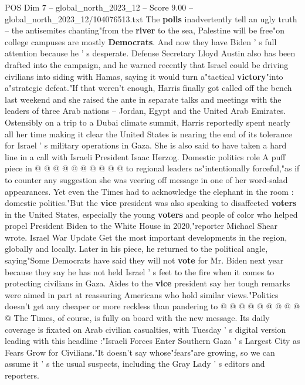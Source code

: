 \begin{textsample}{POS Dim 7 – global\_north\_2023\_12 – Score 9.00 – global\_north\_2023\_12/104076513.txt}  \label{ex:f7_pos_152}
The \textbf{polls} inadvertently tell an ugly truth -- the antisemites chanting"from the \textbf{river} to the sea, Palestine will be free"on college campuses are mostly \textbf{Democrats}.
And now they have Biden ' s full attention because he ' s desperate.
Defense Secretary Lloyd Austin also has been drafted into the campaign, and he warned recently that Israel could be driving civilians into siding with Hamas, saying it would turn a"tactical \textbf{victory}"into a"strategic defeat."If that weren't enough, Harris finally got called off the bench last weekend and she raised the ante in separate talks and meetings with the leaders of three Arab nations -- Jordan, Egypt and the United Arab Emirates.
Ostensibly on a trip to a Dubai climate summit, Harris reportedly spent nearly all her time making it clear the United States is nearing the end of its tolerance for Israel ' s military operations in Gaza.
She is also said to have taken a hard line in a call with Israeli President Isaac Herzog.
Domestic politics role A puff piece in @ @ @ @ @ @ @ @ @ @ to regional leaders as"intentionally forceful,"as if to counter any suggestion she was veering off message in one of her word-salad appearances.
Yet even the Times had to acknowledge the elephant in the room : domestic politics."But the \textbf{vice} president was also speaking to disaffected \textbf{voters} in the United States, especially the young \textbf{voters} and people of color who helped propel President Biden to the White House in 2020,"reporter Michael Shear wrote.
Israel War Update Get the most important developments in the region, globally and locally.
Later in his piece, he returned to the political angle, saying"Some Democrats have said they will not \textbf{vote} for Mr.
Biden next year because they say he has not held Israel ' s feet to the fire when it comes to protecting civilians in Gaza.
Aides to the \textbf{vice} president say her tough remarks were aimed in part at reassuring Americans who hold similar views."Politics doesn't get any cheaper or more reckless than pandering to @ @ @ @ @ @ @ @ @ @ The Times, of course, is fully on board with the new message.
Its daily coverage is fixated on Arab civilian casualties, with Tuesday ' s digital version leading with this headline :"Israeli Forces Enter Southern Gaza ' s Largest City as Fears Grow for Civilians."It doesn't say whose"fears"are growing, so we can assume it ' s the usual suspects, including the Gray Lady ' s editors and reporters.

\end{textsample}
